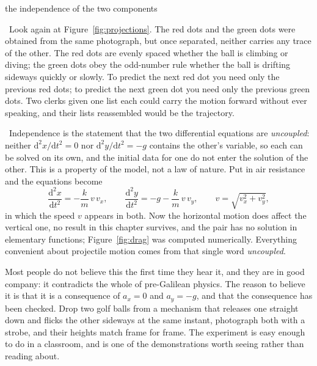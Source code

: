 \documentclass[11pt,twoside,openany]{book}
\newcommand{\dd}{\mathrm{d}}
\newcommand{\dderiv}[2]{\frac{\dd^2 #1}{\dd #2^2}}
\newcounter{check}[chapter]
\newcommand{\viewtag}[3]{\fcolorbox{#2}{#3}{\footnotesize\textbf{\textcolor{#2}{#1}}}}
\newcommand{\elemtag}{\viewtag{Elementary}{elemcol}{elempale}}
\newcommand{\calctag}{\viewtag{Calculus}{calccol}{calcpale}}
\newcommand{\elem}{\par\medskip\noindent\elemtag\ }
\newcommand{\calc}{\par\medskip\noindent\calctag\ }
\begin{document}
\begin{twoviews}{the independence of the two components}
\elem Look again at Figure~\ref{fig:projections}. The red dots and the green dots were obtained from the same photograph, but once separated, neither carries any trace of the other. The red dots are evenly spaced whether the ball is climbing or diving; the green dots obey the odd-number rule whether the ball is drifting sideways quickly or slowly. To predict the next red dot you need only the previous red dots; to predict the next green dot you need only the previous green dots. Two clerks given one list each could carry the motion forward without ever speaking, and their lists reassembled would be the trajectory.

\calc Independence is the statement that the two differential equations are \emph{uncoupled}: neither $\dd^2x/\dd t^2 = 0$ nor $\dd^2 y/\dd t^2 = -g$ contains the other's variable, so each can be solved on its own, and the initial data for one do not enter the solution of the other. This is a property of the model, not a law of nature. Put in air resistance and the equations become
\[
\dderiv{x}{t} = -\frac{k}{m}\,v\,v_x, \qquad \dderiv{y}{t} = -g - \frac{k}{m}\,v\,v_y, \qquad v = \sqrt{v_x^2+v_y^2},
\]
in which the speed $v$ appears in both. Now the horizontal motion does affect the vertical one, no result in this chapter survives, and the pair has no solution in elementary functions; Figure~\ref{fig:drag} was computed numerically. Everything convenient about projectile motion comes from that single word \emph{uncoupled}.
\end{twoviews}

Most people do not believe this the first time they hear it, and they are in good company: it contradicts the whole of pre-Galilean physics. The reason to believe it is that it is a consequence of $a_x = 0$ and $a_y = -g$, and that the consequence has been checked. Drop two golf balls from a mechanism that releases one straight down and flicks the other sideways at the same instant, photograph both with a strobe, and their heights match frame for frame. The experiment is easy enough to do in a classroom, and is one of the demonstrations worth seeing rather than reading about.
\end{document}
